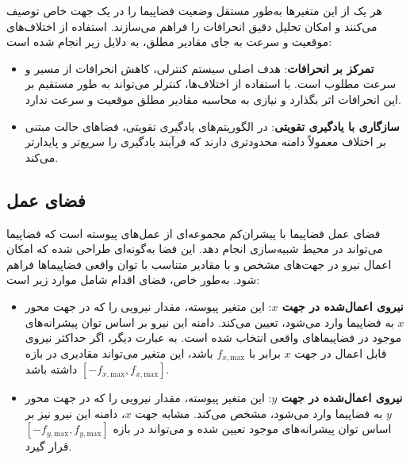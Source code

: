 هر یک از این متغیرها به‌طور مستقل وضعیت فضاپیما را در یک جهت خاص توصیف می‌کنند و امکان تحلیل دقیق انحرافات را فراهم می‌سازند.
استفاده از اختلاف‌های موقعیت و سرعت به جای مقادیر مطلق، به دلایل زیر انجام شده است:
\begin{itemize}
    \item \textbf{تمرکز بر انحرافات}: هدف اصلی سیستم کنترلی، کاهش انحرافات از مسیر و سرعت مطلوب است. با استفاده از اختلاف‌ها، کنترلر می‌تواند به طور مستقیم بر این انحرافات اثر بگذارد و نیازی به محاسبه مقادیر مطلق موقعیت و سرعت ندارد.
    \item \textbf{سازگاری با یادگیری تقویتی}: در الگوریتم‌های یادگیری تقویتی، فضاهای حالت مبتنی بر اختلاف معمولاً دامنه محدودتری دارند که فرآیند یادگیری را سریع‌تر و پایدارتر می‌کند.
\end{itemize}

	
	\subsection{فضای عمل }
	

	
		فضای عمل 
		فضاپیما با پیشران‌کم
		مجموعه‌ای از عمل‌های پیوسته است که فضاپیما می‌تواند در محیط شبیه‌سازی انجام دهد. این فضا به‌گونه‌ای طراحی شده که امکان اعمال نیرو در جهت‌های مشخص و با مقادیر متناسب با توان واقعی فضاپیماها فراهم شود. به‌طور خاص، فضای اقدام شامل موارد زیر است:
	
	\begin{itemize}
		\item \textbf{نیروی اعمال‌شده در جهت \( x \)}: این متغیر پیوسته، مقدار نیرویی را که در جهت محور \( x \) به فضاپیما وارد می‌شود، تعیین می‌کند. دامنه این نیرو بر اساس توان پیشرانه‌های موجود در فضاپیماهای واقعی انتخاب شده است. به عبارت دیگر، اگر حداکثر نیروی قابل اعمال در جهت \( x \) برابر با \( f_{x,\text{max}} \) باشد، این متغیر می‌تواند مقادیری در بازه \( [-f_{x,\text{max}}, f_{x,\text{max}}] \) داشته باشد.
		
		\item \textbf{نیروی اعمال‌شده در جهت \( y \)}: این متغیر پیوسته، مقدار نیرویی را که در جهت محور \( y \) به فضاپیما وارد می‌شود، مشخص می‌کند. مشابه جهت \( x \)، دامنه این نیرو نیز بر اساس توان پیشرانه‌های موجود تعیین شده و می‌تواند در بازه \( [-f_{y,\text{max}}, f_{y,\text{max}}] \) قرار گیرد.
	\end{itemize}
	
